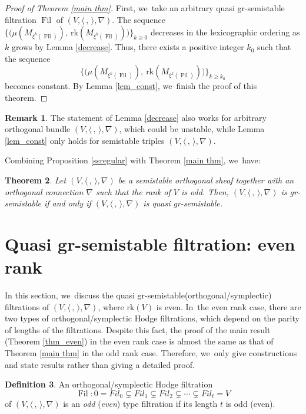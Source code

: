 \documentclass[JEP,XML,SOM,Unicode,published]{cedram}
\newcommand{\Fil}{\textit{Fil}}
\newcommand{\grsemistable}{gr\nobreakdash-semi\-stable\xspace}
\DeclareMathOperator{\Filt}{Fil}
\newcommand{\rk}{\mathrm{rk}}
\theoremstyle{plain}
\newtheorem{thm}{Theorem}[section]
\theoremstyle{definition}
\newtheorem{defn}[thm]{Definition}
\newtheorem{rem}[thm]{Remark}
\begin{document}
\begin{proof}[Proof of Theorem \ref{main thm}]
First, we~take an arbitrary quasi \grsemistable filtration $\Filt$ of $(V,\langle \,, \, \rangle,\nabla)$.
The sequence $\{\big(\mu(M_{\xi^k(\Filt)}),\ \rk(M_{\xi^k(\Filt)})\big)\}_{k\geq 0}$ decreases in the lexicographic ordering as $k$ grows by Lemma \ref{decrease}.
Thus, there exists a positive integer $k_0$ such that the sequence
\[
\{\big(\mu(M_{\xi^k(\Filt)}),\ \rk(M_{\xi^k(\Filt)})\big)\}_{k\geq k_0}
\]
becomes constant.
By Lemma \ref{lem_const}, we~finish the proof of this theorem.
\end{proof}

\begin{rem}
The statement of Lemma \ref{decrease} also works for arbitrary orthogonal bundle $(V, \langle \,, \, \rangle, \nabla)$, which could be unstable, while Lemma \ref{lem_const} only holds for semistable triples $(V, \langle \,, \, \rangle, \nabla)$.
\end{rem}

Combining Proposition \ref{ssregular} with Theorem \ref{main thm}, we~have:

\begin{thm}\label{thm_gr_and_quasi_gr_odd}
Let $(V,\langle \,, \, \rangle,\nabla)$ be a semistable orthogonal sheaf together with an orthogonal connection $\nabla$ such that the rank of $V$ is odd. Then, $(V,\langle \,, \, \rangle,\nabla)$ is \grsemistable if and only if $(V,\langle \,, \, \rangle,\nabla)$ is quasi \grsemistable.
\end{thm}

\section{Quasi \texorpdfstring{\protect\grsemistable}{grsemistable} filtration: even rank}\label{sect_even}
In this section, we~discuss the quasi \grsemistable (orthogonal/symplectic) filtrations of $(V, \langle \,, \, \rangle, \nabla)$, where $\rk(V)$ is even. In~the even rank case, there are two types of orthogonal/symplectic Hodge filtrations, which depend on the parity of lengths of the filtrations. Despite this fact, the proof of the main result (Theorem \ref{thm_even}) in the even rank case is almost the same as that of Theorem \ref{main thm} in the odd rank case. Therefore, we~only give constructions and state results rather than giving a detailed proof.

\begin{defn}
An orthogonal/symplectic Hodge filtration
\[
\Filt: 0=\Fil_0\subsetneq \Fil_1 \subsetneq \Fil_2 \subsetneq \cdots\subsetneq \Fil_t=V
\]
of $(V, \langle \,, \, \rangle, \nabla)$ is an \emph{odd} (\resp \emph{even}) type filtration if its length $t$ is odd (\resp even).
\end{defn}
\end{document}
